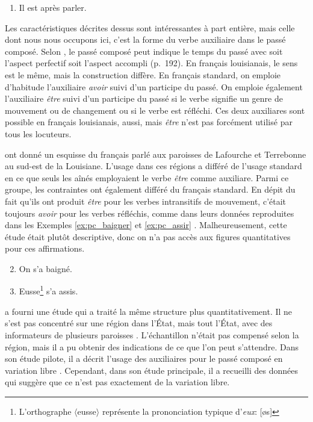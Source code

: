 \documentclass{article}
\newcommand{\lexi}[1]{\textit{#1}}
\newcommand{\orth}[1]{$\langle$#1$\rangle$}
\begin{document}
    \begin{enumerate}
      \item \label{ex:progressif} Il est après parler.
    \end{enumerate}

    Les caractéristiques décrites dessus sont intéressantes à part entière, mais celle dont nous nous occupons ici, c'est la forme du verbe auxiliaire dans le passé composé.
    Selon \textcite{luscher_emplois_1996}, le passé composé peut indique le temps du passé avec soit l'aspect perfectif soit l'aspect accompli (p.~192).
    En français louisianais, le sens est le même, mais la construction diffère.
    En français standard, on emploie d'habitude l'auxiliaire \lexi{avoir} suivi d'un participe du passé.
    On emploie également l'auxiliaire \lexi{être} suivi d'un participe du passé si le verbe signifie un genre de mouvement ou de changement ou si le verbe est réfléchi.
    Ces deux auxiliares sont possible en français louisianais, aussi, mais \lexi{être} n'est pas forcément utilisé par tous les locuteurs.

    \textcite{papen_structural_1997} ont donné un esquisse du français parlé aux paroisses de Lafourche et Terrebonne au sud-est de la Louisiane.
    L'usage dans ces régions a différé de l'usage standard en ce que seuls les aînés employaient le verbe \lexi{être} comme auxiliare.
    Parmi ce groupe, les contraintes ont également différé du français standard.
    En dépit du fait qu'ils ont produit \lexi{être} pour les verbes intransitifs de mouvement, c'était toujours \lexi{avoir} pour les verbes réfléchis, comme dans leurs données reproduites dans les Exemples \ref{ex:pc_baigner} et \ref{ex:pc_assir} \parencite[p.~101]{papen_structural_1997}.
    Malheureusement, cette étude était plutôt descriptive, donc on n'a pas accès aux figures quantitatives pour ces affirmations.

    \begin{enumerate}
      \setcounter{enumi}{1}
      \item \label{ex:pc_baigner} On s'a baigné.
      \item \label{ex:pc_assir} Eusse\footnote{L'orthographe \orth{eusse} représente la prononciation typique d'\lexi{eux}: [øs]} s'a assis.
    \end{enumerate}

    \textcite{byers_defining_1988} a fourni une étude qui a traité la même structure plus quantitativement.
    Il ne s'est pas concentré sur une région dans l'État, mais tout l'État, avec des informateurs de plusieurs paroisses \parencite[p.~47]{byers_defining_1988}.
    L'échantillon n'était pas compensé selon la région, mais il a pu obtenir des indications de ce que l'on peut s'attendre.
    Dans son étude pilote, il a décrit l'usage des auxiliaires pour le passé composé en variation libre \parencite[pp.~50-51]{byers_defining_1988}.
    Cependant, dans son étude principale, il a recueilli des données qui suggère que ce n'est pas exactement de la variation libre.
\end{document}
